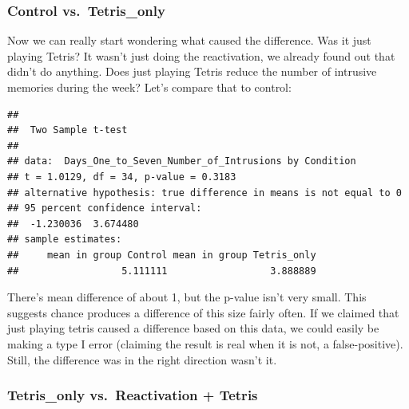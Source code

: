 \documentclass[]{book}
\newenvironment{Shaded}{\begin{snugshade}}{\end{snugshade}}
\newcommand{\KeywordTok}[1]{\textcolor[rgb]{0.13,0.29,0.53}{\textbf{{#1}}}}
\newcommand{\DataTypeTok}[1]{\textcolor[rgb]{0.13,0.29,0.53}{{#1}}}
\newcommand{\StringTok}[1]{\textcolor[rgb]{0.31,0.60,0.02}{{#1}}}
\newcommand{\OtherTok}[1]{\textcolor[rgb]{0.56,0.35,0.01}{{#1}}}
\newcommand{\NormalTok}[1]{{#1}}
\theoremstyle{definition}
\theoremstyle{definition}
\theoremstyle{definition}
\theoremstyle{remark}
\begin{document}
\subsubsection{Control vs.~Tetris\_only}\label{control-vs.tetris_only}

Now we can really start wondering what caused the difference. Was it
just playing Tetris? It wasn't just doing the reactivation, we already
found out that didn't do anything. Does just playing Tetris reduce the
number of intrusive memories during the week? Let's compare that to
control:

\begin{Shaded}
\end{Shaded}

\begin{verbatim}
## 
##  Two Sample t-test
## 
## data:  Days_One_to_Seven_Number_of_Intrusions by Condition
## t = 1.0129, df = 34, p-value = 0.3183
## alternative hypothesis: true difference in means is not equal to 0
## 95 percent confidence interval:
##  -1.230036  3.674480
## sample estimates:
##     mean in group Control mean in group Tetris_only 
##                  5.111111                  3.888889
\end{verbatim}

There's mean difference of about 1, but the p-value isn't very small.
This suggests chance produces a difference of this size fairly often. If
we claimed that just playing tetris caused a difference based on this
data, we could easily be making a type I error (claiming the result is
real when it is not, a false-positive). Still, the difference was in the
right direction wasn't it.

\subsubsection{Tetris\_only vs.~Reactivation +
Tetris}\label{tetris_only-vs.reactivation-tetris}
\end{document}
